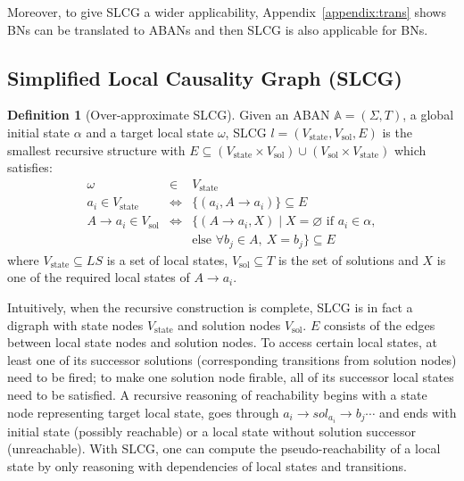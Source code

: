 \documentclass{article}
\theoremstyle{definition}
\newtheorem{definition}{Definition}
\newcommand{\st}{{\mathrm{state}}}
\newcommand{\sol}{{\mathrm{sol}}}
\begin{document}
Moreover, to give SLCG a wider applicability, Appendix~\ref{appendix:trans} shows BNs can be translated to ABANs and then SLCG is also applicable for BNs.

\subsection{Simplified Local Causality Graph (SLCG)}
\begin{definition}[Over-approximate SLCG]\label{defSLCG}
Given an ABAN $\mathbb{A} = (\Sigma,T)$, a global initial state $\alpha$ and a target local state $\omega$, SLCG $l= (V_\st,V_\sol,E)$ is the smallest recursive structure with $E \subseteq (V_\st\times V_\sol)\cup (V_\sol\times V_\st)$ which satisfies:
\begin{eqnarray*}
    \omega&\in& V_\st \\
    a_i\in V_\st &\Leftrightarrow& \{ (a_i, A\to a_i)\}\subseteq E \\
    A\to a_i\in V_\sol&\Leftrightarrow& \{ (A\to a_i,X)\mid X= \varnothing \text{ if } a_i\in \alpha,\\
    &&\text{else }\forall b_j\in A,\ X= b_j\}\subseteq E
\end{eqnarray*}
where $V_\st\subseteq LS$ is a set of local states, $V_\sol\subseteq T$ is the set of solutions and $X$ is one of the required local states of $A\to a_i$.
\end{definition}
Intuitively, when the recursive construction is complete, SLCG is in fact a digraph with state nodes $V_\st$ and solution nodes $V_\sol$. 
$E$ consists of the edges between local state nodes and solution nodes. 
To access certain local states, at least one of its successor solutions (corresponding transitions from solution nodes) need to be fired; to make one solution node firable, all of its successor local states need to be satisfied. 
A recursive reasoning of reachability begins with a state node representing target local state, goes through $a_i\to sol_{a_i}\to b_j \cdots$ and ends with initial state (possibly reachable) or a local state without solution successor (unreachable). 
With SLCG, one can compute the pseudo-reachability of a local state by only reasoning with dependencies of local states and transitions.
\end{document}
